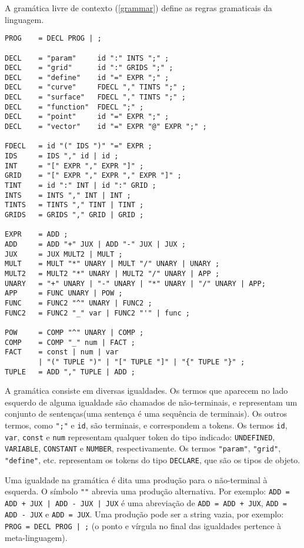 A gramática livre de contexto (\ref{grammar}) define as regras gramaticais da linguagem.
\begin{lstlisting}[caption=Gramática livre de contexto, label=grammar]
PROG    = DECL PROG | ;

DECL    = "param"     id ":" INTS ";" ;
DECL    = "grid"      id ":" GRIDS ";" ;
DECL    = "define"    id "=" EXPR ";" ;
DECL    = "curve"     FDECL "," TINTS ";" ;
DECL    = "surface"   FDECL "," TINTS ";" ;
DECL    = "function"  FDECL ";" ;
DECL    = "point"     id "=" EXPR ";" ;
DECL    = "vector"    id "=" EXPR "@" EXPR ";" ;

FDECL   = id "(" IDS ")" "=" EXPR ;
IDS     = IDS "," id | id ;
INT     = "[" EXPR "," EXPR "]" ;
GRID    = "[" EXPR "," EXPR "," EXPR "]" ;
TINT    = id ":" INT | id ":" GRID ;
INTS    = INTS "," INT | INT ;
TINTS   = TINTS "," TINT | TINT ;
GRIDS   = GRIDS "," GRID | GRID ;

EXPR    = ADD ;
ADD     = ADD "+" JUX | ADD "-" JUX | JUX ;
JUX     = JUX MULT2 | MULT ;
MULT    = MULT "*" UNARY | MULT "/" UNARY | UNARY ;
MULT2   = MULT2 "*" UNARY | MULT2 "/" UNARY | APP ;
UNARY   = "+" UNARY | "-" UNARY | "*" UNARY | "/" UNARY | APP;
APP     = FUNC UNARY | POW ;
FUNC    = FUNC2 "^" UNARY | FUNC2 ;
FUNC2   = FUNC2 "_" var | FUNC2 "'" | func ;

POW     = COMP "^" UNARY | COMP ;
COMP    = COMP "_" num | FACT ;
FACT    = const | num | var
        | "(" TUPLE ")" | "[" TUPLE "]" | "{" TUPLE "}" ;
TUPLE   = ADD "," TUPLE | ADD ;
\end{lstlisting}

A gramática consiste em diversas igualdades.
Os termos que aparecem no lado esquerdo de alguma igualdade são chamados de não-terminais,
e representam um conjunto de sentenças(uma sentença é uma sequência de terminais).
Os outros termos, como \texttt{";"} e \texttt{id}, são terminais,
e correspondem a tokens. Os termos \texttt{id}, \texttt{var}, \texttt{const}
e \texttt{num} representam qualquer token do tipo indicado:
\texttt{UNDEFINED}, \texttt{VARIABLE}, \texttt{CONSTANT} e \texttt{NUMBER}, respectivamente.
Os termos \texttt{"param"}, \texttt{"grid"}, \texttt{"define"}, etc.
representam os tokens do tipo \texttt{DECLARE}, que são os tipos de objeto.

Uma igualdade na gramática é dita uma produção para o não-terminal à esquerda.
O símbolo \texttt{"\textbar"}  abrevia uma produção alternativa. 
Por exemplo: \texttt{ADD = ADD + JUX | ADD - JUX | JUX}
é uma abreviação de \texttt{ADD = ADD + JUX}, \texttt{ADD = ADD - JUX} e \texttt{ADD = JUX}.
Uma produção pode ser a string vazia, por exemplo: \texttt{PROG = DECL PROG | ;}
(o ponto e vírgula no final das igualdades pertence à meta-linguagem).

